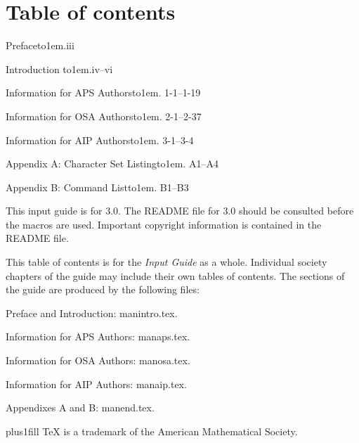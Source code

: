 \section*{Table of contents}
{ \rightskip\leftskip


\vspace{.4in}
{\parindent0pt\baselineskip

Preface\leaders\hbox to1em{\hfil.\hfil}\hfill iii

Introduction \leaders\hbox to1em{\hfil.\hfil}\hfill iv--vi

\REVTeX{} Information for APS Authors\leaders\hbox to1em{\hfil.\hfil}\hfill
1-1--1-19

\REVTeX{} Information for OSA Authors\leaders\hbox to1em{\hfil.\hfil}\hfill
2-1--2-37

\REVTeX{} Information for AIP Authors\leaders\hbox to1em{\hfil.\hfil}\hfill
3-1--3-4

Appendix A: Character Set Listing\leaders\hbox to1em{\hfil.\hfil}\hfill
A1--A4

Appendix B: Command List\leaders\hbox to1em{\hfil.\hfil}\hfill
B1--B3

\vspace{.4in}

}

This input guide is for \REVTeX{} 3.0. The README file for \REVTeX{}
3.0 should be consulted before the \REVTeX{} macros are used. Important
copyright information is contained in the README file.

\vspace{\baselineskip}

This table of contents is for the {\em \REVTeX{} Input Guide\/} as a whole.
Individual society chapters of the guide may include their own tables of
contents. The sections of the guide are produced by the following files:

Preface and Introduction: manintro.tex.

\REVTeX{} Information for APS Authors: manaps.tex.

\REVTeX{} Information for OSA Authors: manosa.tex.

\REVTeX{} Information for AIP Authors: manaip.tex.

Appendixes A and B: manend.tex.

\vfill

\begin{center}
 plus1fill \rightskip\leftskip
\TeX{} is a trademark of the American Mathematical Society.\par
\end{center}

}

